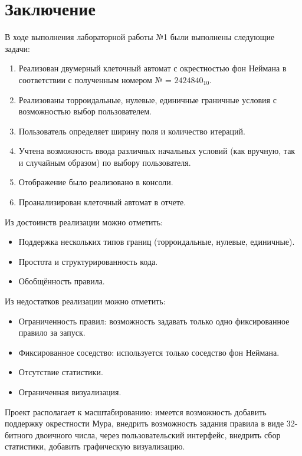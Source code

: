 \documentclass[a4paper, final]{article}
\begin{document}
\cleardoublepage
{}
\newpage
{}
\section*{Заключение}
В ходе выполнения лабораторной работы №1 были выполнены следующие задачи:
\begin{enumerate}
  \item Реализован двумерный клеточный автомат с окрестностью фон Неймана в соответствии с 
  полученным номером № = $2424840_{10}$.
  \item Реализованы торроидальные, нулевые, единичные граничные условия с возможностью выбор пользователем.
  \item Пользователь определяет ширину поля и количество итераций. 
  \item Учтена возможность ввода различных начальных условий (как вручную, так и 
  случайным образом) по выбору пользователя. 
  \item Отображение было реализовано в консоли.
  \item Проанализирован клеточный автомат в отчете.
\end{enumerate}

\noindent Из достоинств реализации можно отметить:
\begin{itemize}
  \item Поддержка нескольких типов границ (торроидальные, нулевые, единичные).
  \item Простота и структурированность кода.
  \item Обобщённость правила.
\end{itemize}

\noindent Из недостатков реализации можно отметить: 
\begin{itemize}
  \item Ограниченность правил: возможность задавать только одно фиксированное правило за запуск.
  \item Фиксированное соседство: используется только соседство фон Неймана.
  \item Отсутствие статистики.
  \item Ограниченная визуализация.
\end{itemize}

Проект располагает к масштабированию: имеется возможность добавить поддержку окрестности Мура, внедрить возможность
задания правила в виде 32-битного двоичного числа, через пользовательский интерфейс, внедрить сбор статистики, добавить графическую визуализацию.
\end{document}
